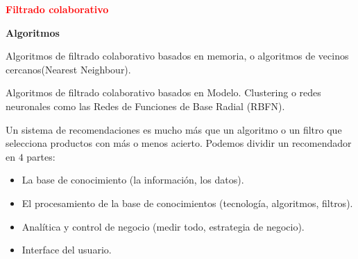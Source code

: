 \documentclass[11pt]{beamer}
\begin{document}
\begin{frame}{\textbf{\textcolor{red}{Filtrado colaborativo }}}

\textbf{Algoritmos}

\begin{itemize}
	\scriptsize{
	\item Algoritmos de filtrado colaborativo basados en memoria, o algoritmos de vecinos cercanos(Nearest Neighbour).
}
\scriptsize{
\item Algoritmos de filtrado colaborativo basados en Modelo. Clustering o redes neuronales como las Redes de Funciones de Base Radial (RBFN).}
\end{itemize}

\vspace{0.2cm}

\scriptsize{Un sistema de recomendaciones es mucho m\'as que un algoritmo o un filtro que selecciona productos con m\'as o menos acierto. Podemos dividir un recomendador en $4$ partes: }

\begin{itemize}
	\item La base de conocimiento (la informaci\'on, los datos).
	\item El procesamiento de la base de conocimientos (tecnolog\'ia, algoritmos, filtros).
	\item Anal\'itica y control de negocio (medir todo, estrategia de negocio).
	\item Interface del usuario.
\end{itemize}	
	
\end{frame}
\end{document}

